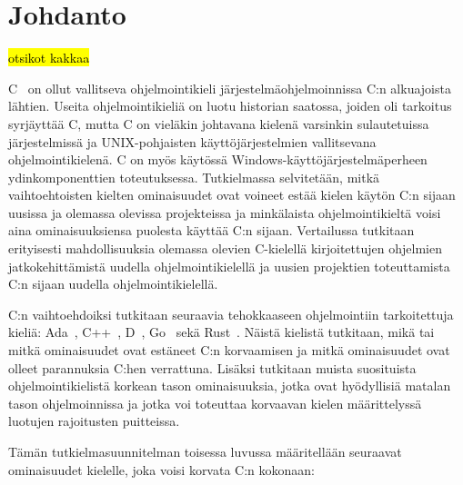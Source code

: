 \section{Johdanto} 

\hl{otsikot kakkaa}

C~\citep{C18} on ollut vallitseva ohjelmointikieli järjestelmäohjelmoinnissa
C:n alkuajoista lähtien. Useita ohjelmointikieliä on luotu historian saatossa,
joiden oli tarkoitus syrjäyttää C, mutta C on vieläkin johtavana kielenä
varsinkin sulautetuissa järjestelmissä ja UNIX-pohjaisten käyttöjärjestelmien
vallitsevana ohjelmointikielenä. C on myös käytössä
Windows-käyttöjärjestelmäperheen ydinkomponenttien toteutuksessa.
Tutkielmassa selvitetään, mitkä vaihtoehtoisten kielten ominaisuudet ovat
voineet estää kielen käytön C:n sijaan uusissa ja olemassa olevissa projekteissa
ja minkälaista ohjelmointikieltä voisi aina ominaisuuksiensa puolesta käyttää
C:n sijaan. Vertailussa tutkitaan erityisesti mahdollisuuksia olemassa olevien
C-kielellä kirjoitettujen ohjelmien jatkokehittämistä uudella
ohjelmointikielellä ja uusien projektien toteuttamista C:n sijaan uudella
ohjelmointikielellä.

C:n vaihtoehdoiksi tutkitaan seuraavia tehokkaaseen ohjelmointiin tarkoitettuja
kieliä: Ada~\citep{ADA12}, C++~\citep{CPP14}, D~\citep{D}, Go~\citep{golang}
sekä Rust~\citep{rust}. Näistä kielistä tutkitaan, mikä tai mitkä ominaisuudet
ovat estäneet C:n korvaamisen ja mitkä ominaisuudet ovat olleet parannuksia
C:hen verrattuna. Lisäksi tutkitaan muista suosituista ohjelmointikielistä
korkean tason ominaisuuksia, jotka ovat hyödyllisiä matalan tason
ohjelmoinnissa ja jotka voi toteuttaa korvaavan kielen määrittelyssä luotujen
rajoitusten puitteissa.


Tämän tutkielmasuunnitelman toisessa luvussa määritellään seuraavat
ominaisuudet kielelle, joka voisi korvata C:n kokonaan:

